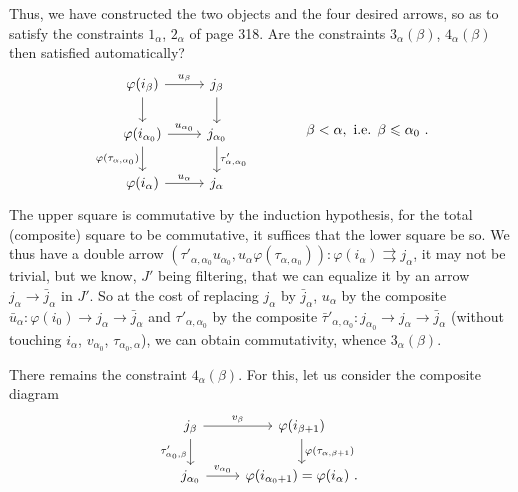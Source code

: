 Thus, we have constructed the two objects and the four desired arrows, so as to satisfy the constraints $1_\alpha$, $2_\alpha$ of page 318. Are the constraints $3_\alpha(\beta)$, $4_\alpha(\beta)$ then satisfied automatically?
\[
\begin{tikzcd}
\varphi(i_\beta) \arrow[r, "u_\beta"] \arrow[d] & j_\beta \arrow[d] \\
\varphi(i_{\alpha_0}) \arrow[r, "u_{\alpha_0}"] \arrow[d, "\varphi(\tau_{\alpha,\alpha_0})"'] & j_{\alpha_0} \arrow[d, "\tau'_{\alpha,\alpha_0}"] \\
\varphi(i_\alpha) \arrow[r, "u_\alpha"] & j_\alpha
\end{tikzcd}
\qquad\qquad \beta<\alpha, \text{ i.e. } \beta\leqslant\alpha_0\ .
\]
The upper square is commutative by the induction hypothesis, for the total (composite) square to be commutative, it suffices that the lower square be so. We thus have a double arrow $(\tau'_{\alpha,\alpha_0}u_{\alpha_0},u_\alpha\varphi(\tau_{\alpha,\alpha_0})):\varphi(i_\alpha)\rightrightarrows j_\alpha$, it may not be trivial, but we know, $J'$ being filtering, that we can equalize it by an arrow $j_\alpha\longrightarrow\bar{j}_\alpha$ in $J'$. So at the cost of replacing $j_\alpha$ by %
$\bar{j}_\alpha$, $u_\alpha$ by the composite $\bar{u}_\alpha:\varphi(i_0)\longrightarrow j_\alpha\longrightarrow\bar{j}_\alpha$ and $\tau'_{\alpha,\alpha_0}$ by the composite $\bar{\tau}'_{\alpha,\alpha_0}:j_{\alpha_0}\longrightarrow j_\alpha\longrightarrow\bar{j}_\alpha$ (without touching $i_\alpha$, $v_{\alpha_0}$, $\tau_{\alpha_0,\alpha}$), we can obtain commutativity, whence $3_\alpha(\beta)$. %

There remains the constraint $4_\alpha(\beta)$. For this, let us consider the composite diagram
\[
\begin{tikzcd}
j_\beta \arrow[r, "v_\beta"] \arrow[d, "\tau'_{\alpha_0,\beta}"'] & \varphi(i_{\beta+1}) \arrow[d, "\varphi(\tau_{\alpha,\beta+1})"] \\
j_{\alpha_0} \arrow[r, "v_{\alpha_0}"] & \varphi(i_{\alpha_0+1})=\varphi(i_\alpha)\ .
\end{tikzcd}
\]

